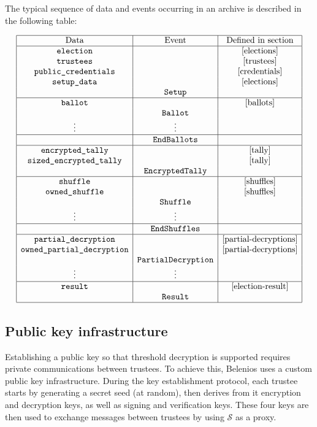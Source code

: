 \documentclass[a4paper]{article}
\begin{document}
The typical sequence of data and events occurring in an archive is
described in the following table:

\begin{gather*}
\begin{array}{|c|c|c|}
  \hline
  \text{Data}&\text{Event}&\text{Defined in section}\\
  \hline
  \texttt{election}&&\ref{elections}\\
  \texttt{trustees}&&\ref{trustees}\\
  \texttt{public\_credentials}&&\ref{credentials}\\
  \texttt{setup\_data}&&\ref{elections}\\
  &\texttt{Setup}& \\
  \hline
  \texttt{ballot}&&\ref{ballots}\\
  &\texttt{Ballot}&\\
  \vdots&\vdots&\\
  \hline
  &\texttt{EndBallots}&\\
  \hline
  \texttt{encrypted\_tally}&&\ref{tally}\\
  \texttt{sized\_encrypted\_tally}&&\ref{tally}\\
  &\texttt{EncryptedTally}&\\
  \hline
  \texttt{shuffle}&&\ref{shuffles}\\
  \texttt{owned\_shuffle}&&\ref{shuffles}\\
  &\texttt{Shuffle}&\\
  \vdots&\vdots&\\
  \hline
  &\texttt{EndShuffles}&\\
  \hline
  \texttt{partial\_decryption}&&\ref{partial-decryptions}\\
  \texttt{owned\_partial\_decryption}&&\ref{partial-decryptions}\\
  &\texttt{PartialDecryption}&\\
  \vdots&\vdots&\\
  \hline
  \texttt{result}&&\ref{election-result}\\
  &\texttt{Result}&\\
  \hline
\end{array}
\end{gather*}

\subsection{Public key infrastructure}
\label{pki}

Establishing a public key so that threshold decryption is supported
requires private communications between trustees. To achieve this,
Belenios uses a custom public key infrastructure. During the key
establishment protocol, each trustee starts by generating a secret
seed (at random), then derives from it encryption and decryption keys,
as well as signing and verification keys. These four keys are then
used to exchange messages between trustees by using $\mathcal{S}$ as a proxy.
\end{document}
